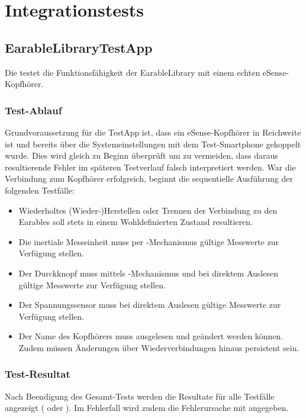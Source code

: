 \documentclass[../implementierung.tex]{subfiles}
\begin{document}
\section{Integrationstests}

\subsection{EarableLibraryTestApp}

	Die  testet die Funktionsfähigkeit der EarableLibrary mit einem echten eSense-Kopfhörer.

	\subsubsection{Test-Ablauf}
		Grundvoraussetzung für die TestApp ist, dass ein eSense-Kopfhörer in Reichweite ist und bereits über die Systemeinstellungen mit dem Test-Smartphone gekoppelt wurde.
		Dies wird gleich zu Beginn überprüft um zu vermeiden, dass daraus resultierende Fehler im späteren Testverlauf falsch interpretiert werden.
		War die Verbindung zum Kopfhörer erfolgreich, beginnt die sequentielle Ausführung der folgenden Testfälle:
		\begin{itemize}
			\item {} Wiederholtes (Wieder-)Herstellen oder Trennen der Verbindung zu den Earables soll stets in einem Wohldefinierten Zustand resultieren.
			\item {} Die inertiale Messeinheit muss per -Mechanismus gültige Messwerte zur Verfügung stellen.
			\item {} Der Durckknopf muss mittels -Mechanismus und bei direktem Auslesen gültige Messwerte zur Verfügung stellen.
			\item {} Der Spannungssensor muss bei direktem Auslesen gültige Messwerte zur Verfügung stellen.
			\item {} Der Name des Kopfhörers muss ausgelesen und geändert werden können. Zudem müssen Änderungen über Wiederverbindungen hinaus persistent sein.
		\end{itemize}

	\subsubsection{Test-Resultat}
		Nach Beendigung des Gesamt-Tests werden die Resultate für alle Testfälle angezeigt ( oder ).
		Im Fehlerfall wird zudem die Fehlerursache mit angegeben.
\end{document}
